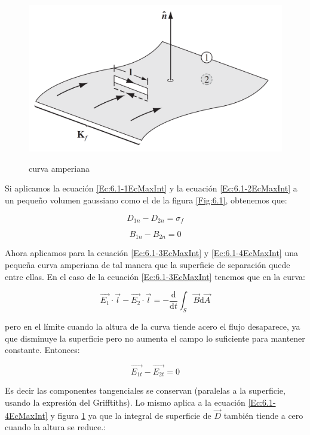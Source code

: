 \documentclass[12pt]{article}
\newcommand{\D}{\mathrm{d}}
\begin{document}
\begin{figure}[h!] \centering
\includegraphics[scale=0.3]{condicionesmaxwell2.png}
\label{Fig:6.2}
\caption{curva amperiana}
\end{figure}

Si aplicamos la ecuación \ref{Ec:6.1-1EcMaxInt} y la ecuación \ref{Ec:6.1-2EcMaxInt} a un pequeño volumen gaussiano como el de la figura \ref{Fig:6.1}, obtenemos que:

\begin{equation}
D_{1n} - D_{2n} = \sigma_f
\end{equation}

\begin{equation}
B_{1n} - B_{2n} = 0
\end{equation}

Ahora aplicamos para la ecuación \ref{Ec:6.1-3EcMaxInt} y \ref{Ec:6.1-4EcMaxInt} una pequeña curva amperiana de tal manera que la superficie de separación quede entre ellas. En el caso de la ecuación \ref{Ec:6.1-3EcMaxInt} tenemos que en la curva:

$$ \vec{E_1} \cdot \vec{l} - \vec{E_2} \cdot \vec{l} = - \dfrac{\D}{\D t} \int_S \vec{B} \D \vec{A} $$

pero en el límite cuando la altura de la curva tiende acero el flujo desaparece, ya que disminuye la superficie pero no aumenta el campo lo suficiente para mantener constante. Entonces:

\begin{equation}
\vec{E_{1t}} - \vec{E_{2t}} = 0
\end{equation}

Es decir las componentes tangenciales se conservan (paralelas a la superficie, usando la expresión del Grifftiths). Lo mismo aplica a la ecuación \ref{Ec:6.1-4EcMaxInt} y figura \ref{Fig:6.2} ya que la integral de superficie de $\vec{D}$ también tiende a cero cuando la altura se reduce.:
\end{document}
